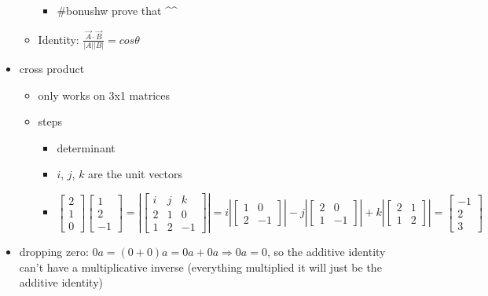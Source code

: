 \documentclass[letterpaper]{article}
\begin{document}
\begin{itemize}
\begin{itemize}
\begin{itemize}
\item \#bonushw prove that \^{}\^{}
\end{itemize}

\item Identity: \(\frac{\vec{A}\cdot\vec{B}}{|A||B|} = cos \theta\)
\end{itemize}

\item cross product

\begin{itemize}
\item only works on 3x1 matrices
\item steps

\begin{itemize}
\item determinant
\item \(i\), \(j\), \(k\) are the unit vectors
\item \[\begin{bmatrix}2\\1\\0\end{bmatrix}\begin{bmatrix}1\\2\\-1\end{bmatrix} =
        \left|\begin{bmatrix}i &j &k\\2 &1 &0\\1 &2 &-1\end{bmatrix}\right| = i\left|\begin{bmatrix}1&0\\2&-1\end{bmatrix}\right|-j\left|\begin{bmatrix}2&0\\1&-1\end{bmatrix}\right| + k\left|\begin{bmatrix}2&1\\1&2\end{bmatrix}\right| = \begin{bmatrix}-1\\2\\3\end{bmatrix}\]
\end{itemize}
\end{itemize}

\item dropping zero: \(0a = (0+0)a = 0a+0a \Rightarrow 0a = 0\), so the
additive identity can't have a multiplicative inverse (everything
multiplied it will just be the additive identity)


\end{itemize}
\end{document}
